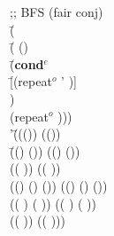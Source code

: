 		\begin{ZZZZschemedisplay}%
;; BFS (fair conj)\\%
\va{$\gt$} \=(  \\%
  \>\PRN \HL \=( ()\\%
  \>  \>\PRN \HL \=(\textbf{cond$^e$}\\%
  \>  \>  \>\PRN \HL \=[(repeat$^o$ ' )]\\%
  \>  \>  \>  \>[(repeat$^o$ '\cn{b} \va{xs})])\\%
  \>  \>  \>(repeat$^o$  )))\\%
'\=((()) (())\\%
 \>\PRN \=(() ()) (() ())\\%
 \> \>(( )) (( ))\\%
 \> \>(() () ()) (() () ())\\%
 \> \>(( ) ( )) (( ) ( ))\\%
 \> \>((  )) ((  )))%
\end{ZZZZschemedisplay}
	